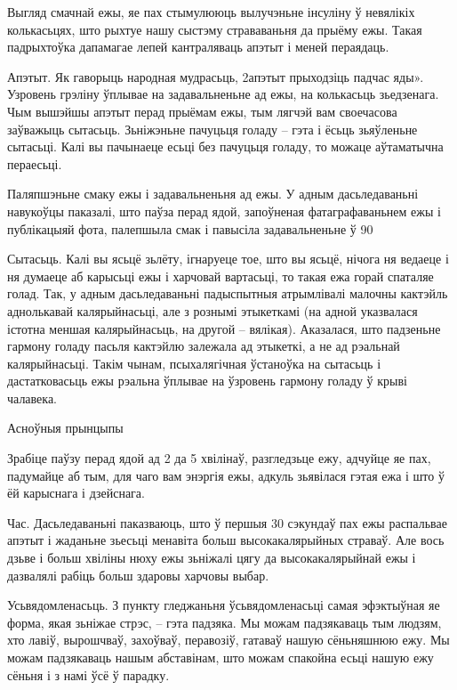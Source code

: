 Выгляд смачнай ежы, яе пах стымулююць вылучэньне інсуліну ў невялікіх колькасьцях, што рыхтуе нашу сыстэму страваваньня да прыёму ежы. Такая падрыхтоўка дапамагае лепей кантраляваць апэтыт і меней пераядаць.

Апэтыт.
Як гаворыць народная мудрасьць, 2апэтыт прыходзіць падчас яды». Узровень грэліну ўплывае на задавальненьне ад ежы, на колькасьць зьедзенага. Чым вышэйшы апэтыт перад прыёмам ежы, тым лягчэй вам своечасова заўважыць сытасьць. Зьніжэньне пачуцьця голаду – гэта і ёсьць зьяўленьне сытасьці. Калі вы пачынаеце есьці без пачуцьця голаду, то можаце аўтаматычна пераесьці.

Паляпшэньне смаку ежы і задавальненьня ад ежы.
У адным дасьледаваньні навукоўцы паказалі, што паўза перад ядой, запоўненая фатаграфаваньнем ежы і публікацыяй фота, палепшыла смак і павысіла задавальненьне ў 90%

Сытасьць.
Калі вы ясьцё зьлёту, ігнаруеце тое, што вы ясьцё, нічога ня ведаеце і ня думаеце аб карысьці ежы і харчовай вартасьці, то такая ежа горай спаталяе голад. Так, у адным дасьледаваньні падыспытныя атрымлівалі малочны кактэйль аднолькавай калярыйнасьці, але з рознымі этыкеткамі (на адной указвалася істотна меншая калярыйнасьць, на другой – вялікая). Аказалася, што падзеньне гармону голаду пасьля кактэйлю залежала ад этыкеткі, а не ад рэальнай калярыйнасьці. Такім чынам, псыхалягічная ўстаноўка на сытасьць і дастатковасьць ежы рэальна ўплывае на ўзровень гармону голаду ў крыві чалавека.

Асноўныя прынцыпы

Зрабіце паўзу перад ядой ад 2 да 5 хвілінаў, разгледзьце ежу, адчуйце яе пах, падумайце аб тым, для чаго вам энэргія ежы, адкуль зьявілася гэтая ежа і што ў ёй карыснага і дзейснага.

Час.
Дасьледаваньні паказваюць, што ў першыя 30 сэкундаў пах ежы распальвае апэтыт і жаданьне зьесьці менавіта больш высокакалярыйных страваў. Але вось дзьве і больш хвіліны нюху ежы зьніжалі цягу да высокакалярыйнай ежы і дазвалялі рабіць больш здаровы харчовы выбар.

Усьвядомленасьць.
З пункту гледжаньня ўсьвядомленасьці самая эфэктыўная яе форма, якая зьніжае стрэс, – гэта падзяка. Мы можам падзякаваць тым людзям, хто лавіў, вырошчваў, захоўваў, перавозіў, гатаваў нашую сёньняшнюю ежу. Мы можам падзякаваць нашым абставінам, што можам спакойна есьці нашую ежу сёньня і з намі ўсё ў парадку.

